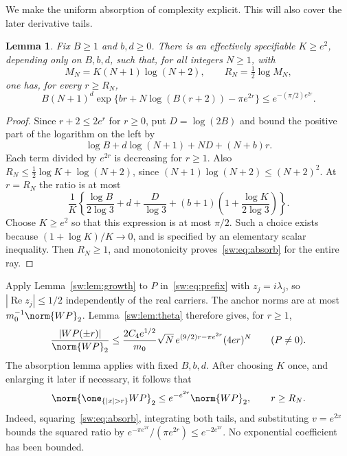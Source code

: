 \documentclass[11pt,a4paper]{article}
\numberwithin{equation}{section}
\newtheorem{lemma}[theorem]{Lemma}
\theoremstyle{definition}\newtheorem{definition}[theorem]{Definition}
\theoremstyle{remark}\newtheorem{remark}[theorem]{Remark}
\DeclareMathOperator{\Rea}{Re}\DeclareMathOperator{\Ima}{Im}
\begin{document}
We make the uniform absorption of complexity explicit. This will also cover the later derivative tails.
\begin{lemma}\label{sw:lem:absorb}
Fix $B\ge1$ and $b,d\ge0$. There is an effectively specifiable $K\ge e^2$, depending only on $B,b,d$, such that, for all integers $N\ge1$, with
\begin{equation}\label{sw:eq:MR}
 M_N=K(N+1)\log(N+2),\qquad R_N=\tfrac12\log M_N,
\end{equation}
one has, for every $r\ge R_N$,
\begin{equation}\label{sw:eq:absorb}
 B(N+1)^d\exp\{br+N\log(B(r+2))-\pi e^{2r}\}
      \le e^{-(\pi/2)e^{2r}}.
\end{equation}
\end{lemma}
\begin{proof}
Since $r+2\le2e^r$ for $r\ge0$, put $D=\log(2B)$ and bound the positive part of the logarithm on the left by
\[
 \log B+d\log(N+1)+ND+(N+b)r.
\]
Each term divided by $e^{2r}$ is decreasing for $r\ge1$. Also
$R_N\le\frac12\log K+\log(N+2)$, since
$(N+1)\log(N+2)\le(N+2)^2$. At $r=R_N$ the ratio is at most
\begin{equation}\label{sw:eq:K-rule}
 \frac1K\left\{\frac{\log B}{2\log3}+d+\frac{D}{\log3}
       +(b+1)\left(1+\frac{\log K}{2\log3}\right)\right\}.
\end{equation}
Choose $K\ge e^2$ so that this expression is at most $\pi/2$. Such a choice exists because $(1+\log K)/K\to0$, and is specified by an elementary scalar inequality. Then $R_N\ge1$, and monotonicity proves~\eqref{sw:eq:absorb} for the entire ray.
\end{proof}

Apply Lemma~\ref{sw:lem:growth} to $P$ in~\eqref{sw:eq:prefix} with $z_j=i\lambda_j$, so $|\Rea z_j|\le1/2$ independently of the real carriers. The anchor norms are at most $m_0^{-1}\norm{WP}_2$. Lemma~\ref{sw:lem:theta} therefore gives, for $r\ge1$,
\begin{equation}\label{sw:eq:u-envelope}
 \frac{|WP(\pm r)|}{\norm{WP}_2}
 \le \frac{2C_4e^{1/2}}{m_0}\sqrt N\,
             e^{(9/2)r-\pi e^{2r}}(4er)^N
 \qquad(P\ne0).
\end{equation}
The absorption lemma applies with fixed $B,b,d$. After choosing $K$ once, and enlarging it later if necessary, it follows that
\begin{equation}\label{sw:eq:u-tail}
 \norm{\one_{\{|x|>r\}}WP}_2\le e^{-e^{2r}}\norm{WP}_2,
 \qquad r\ge R_N.
\end{equation}
Indeed, squaring~\eqref{sw:eq:absorb}, integrating both tails, and substituting $v=e^{2x}$ bounds the squared ratio by
$e^{-\pi e^{2r}}/(\pi e^{2r})\le e^{-2e^{2r}}$.
No exponential coefficient has been bounded.
\end{document}
